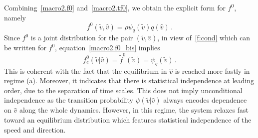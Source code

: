 \documentclass[a4paper]{article}
\theoremstyle{Theorem}\newtheorem{proposition}{Proposition}[section]
\theoremstyle{Remark}\newtheorem{remark}{Remark}[section]
\theoremstyle{Theorem}\newtheorem{theorem}{Theorem}[section]
\newcommand{\hv}{\hat{v}}
\newcommand{\tv}{\tilde{v}}
\newcommand{\tf}{\tilde{f}}
\begin{document}
Combining~\eqref{macro2.f0} and~\eqref{macro2.tf0}, we obtain the explicit form for $f^0$, namely
\begin{equation}\label{macro2.f0_bis}
   f^0(\tv,\hv)=\rho \psi_q(\tv) q(\hv)\, .
\end{equation}
Since $f^0$ is a joint distribution for the pair $(\tv, \hv)$, in view of~\eqref{f:cond} which can be written for $f^0$, equation~\eqref{macro2.f0_bis} implies
\[
f_c^0(\tv|\hv)=\tf^0(\tv)=\psi_q(\tv)\,.
\]
This is coherent with the fact that the equilibrium in $\hv$ is reached more fastly in regime (a). Moreover,
it indicates that there is statistical independence at leading order, due to the separation of time scales. This does not imply unconditional independence as the transition probability $\psi(\tv|\hv)$ always encodes dependence on $\hv$ along the whole dynamics. However, in this regime, the system relaxes 
 fast toward an equilibrium distribution which features  statistical independence of the speed and direction.
 
\end{document}
